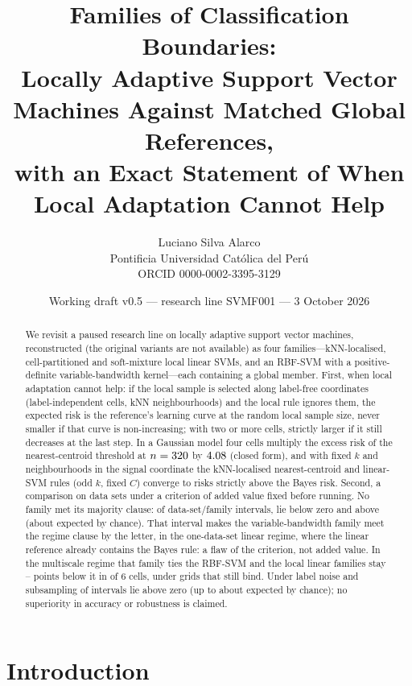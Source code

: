 \documentclass[11pt,a4paper]{article}
\title{\textbf{Families of Classification Boundaries:}\\[2pt]
\large Locally Adaptive Support Vector Machines Against Matched Global References,\\ with an Exact Statement of When Local Adaptation Cannot Help}
\author{Luciano Silva Alarco\\
\small Pontificia Universidad Cat\'olica del Per\'u\\
\small ORCID 0000-0002-3395-3129}
\date{\small Working draft v0.5 --- research line SVMF001 --- 3 October 2026}
\theoremstyle{plain}
\theoremstyle{definition}
\theoremstyle{remark}
\begin{document}
\maketitle

\begin{abstract}
\noindent
We revisit a paused research line on locally adaptive support vector machines, reconstructed (the original variants are not available) as four families---kNN-localised, cell-partitioned and soft-mixture local linear SVMs, and an RBF-SVM with a positive-definite variable-bandwidth kernel---each containing a global member. First, when local adaptation cannot help: if the local sample is selected along label-free coordinates (label-independent cells, kNN neighbourhoods) and the local rule ignores them, the expected risk is the reference's learning curve at the random local sample size, never smaller if that curve is non-increasing; with two or more cells, strictly larger if it still decreases at the last step. In a Gaussian model four cells multiply the excess risk of the nearest-centroid threshold at $n=320$ by $4.08$ (closed form), and with fixed $k$ and neighbourhoods in the signal coordinate the kNN-localised nearest-centroid and linear-SVM rules (odd $k$, fixed $C$) converge to risks strictly above the Bayes risk. Second, a comparison on \NDatasets{} data sets under a criterion of added value fixed before running. No family met its majority clause: of \NCellsMain{} data-set/family intervals, \NNegCellsMain{} lie below zero and \NPosCellsMain{} above (about \ExpectedPosMain{} expected by chance). That interval makes the variable-bandwidth family meet the regime clause by the letter, in the one-data-set linear regime, where the linear reference already contains the Bayes rule: a flaw of the criterion, not added value. In the multiscale regime that family ties the RBF-SVM and the local linear families stay \NegLinLocalMultiLoAbs{}--\NegLinLocalMultiHiAbs{} points below it in \NNegLinLocalMulti{} of 6 cells, under grids that still bind. Under label noise and subsampling \NPosRobustCells{} of \NRobustCells{} intervals lie above zero (up to about \ExpectedPosRobust{} expected by chance); no superiority in accuracy or robustness is claimed.
\end{abstract}

\section{Introduction}\label{sec:intro}
\end{document}
